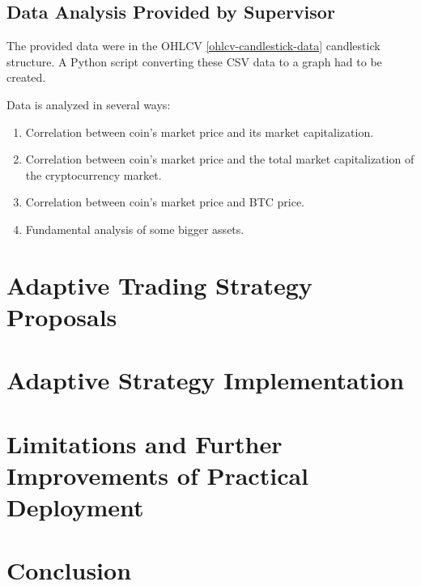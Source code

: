 \section{Data Analysis Provided by Supervisor}

The provided data were in the OHLCV \ref{ohlcv-candlestick-data} candlestick structure. A Python script converting these CSV data to a graph had to be created.

Data is analyzed in several ways:
\begin{enumerate}
    \item Correlation between coin's market price and its market capitalization.
    \item Correlation between coin's market price and the total market capitalization of the cryptocurrency market.
    \item Correlation between coin's market price and BTC price.
    \item Fundamental analysis of some bigger assets.
\end{enumerate}

\chapter{Adaptive Trading Strategy Proposals}
\label{proposal}

\chapter{Adaptive Strategy Implementation}
\label{implementation}

\chapter{Limitations and Further Improvements of Practical Deployment}
\label{limitations}

\chapter{Conclusion}
\label{conclusion}
